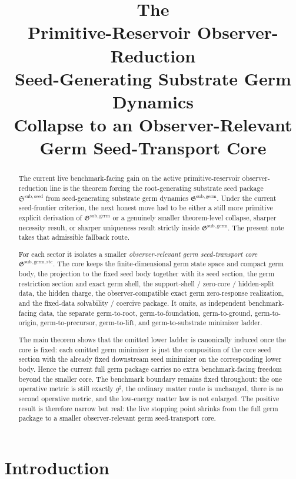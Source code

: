 \documentclass[11pt]{article}
\title{\textbf{The \TheoryName{}}\\[0.4em]
\large Primitive-Reservoir Observer-Reduction\\
\large Seed-Generating Substrate Germ Dynamics\\
\large Collapse to an Observer-Relevant\\
\large Germ Seed-Transport Core}
\author{}
\date{}
\newcommand{\CompletedMetric}{g^{\sharp}}
\newcommand{\SeedPackage}{\mathfrak S^{\mathrm{sub,seed}}}
\newcommand{\GermPackage}{\mathfrak G^{\mathrm{sub,germ}}}
\newcommand{\GermTransportCore}{\mathfrak G^{\mathrm{sub,germ,stc}}}
\begin{document}
\maketitle

\begin{abstract}
The current live benchmark-facing gain on the active primitive-reservoir observer-reduction line is the theorem forcing the root-generating substrate seed package \(\SeedPackage\) from seed-generating substrate germ dynamics \(\GermPackage\). Under the current seed-frontier criterion, the next honest move had to be either a still more primitive explicit derivation of \(\GermPackage\) or a genuinely smaller theorem-level collapse, sharper necessity result, or sharper uniqueness result strictly inside \(\GermPackage\). The present note takes that admissible fallback route.

For each sector it isolates a smaller \emph{observer-relevant germ seed-transport core} \(\GermTransportCore\). The core keeps the finite-dimensional germ state space and compact germ body, the projection to the fixed seed body together with its seed section, the germ restriction section and exact germ shell, the support-shell / zero-core / hidden-split data, the hidden charge, the observer-compatible exact germ zero-response realization, and the fixed-data solvability / coercive package. It omits, as independent benchmark-facing data, the separate germ-to-root, germ-to-foundation, germ-to-ground, germ-to-origin, germ-to-precursor, germ-to-lift, and germ-to-substrate minimizer ladder.

The main theorem shows that the omitted lower ladder is canonically induced once the core is fixed: each omitted germ minimizer is just the composition of the core seed section with the already fixed downstream seed minimizer on the corresponding lower body. Hence the current full germ package carries no extra benchmark-facing freedom beyond the smaller core. The benchmark boundary remains fixed throughout: the one operative metric is still exactly \(\CompletedMetric\), the ordinary matter route is unchanged, there is no second operative metric, and the low-energy matter law is not enlarged. The positive result is therefore narrow but real: the live stopping point shrinks from the full germ package to a smaller observer-relevant germ seed-transport core.
\end{abstract}

\section{Introduction}
\end{document}
